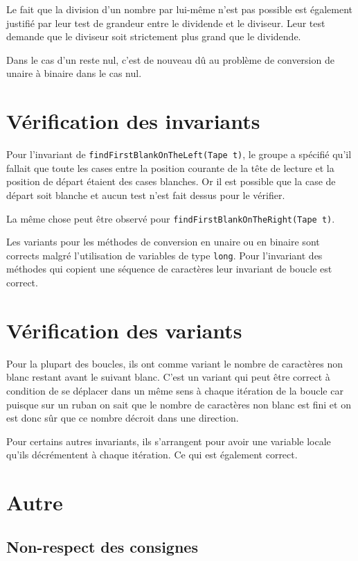 \documentclass[a4paper,11pt]{article}
\begin{document}
Le fait que la division d'un nombre par lui-même n'est pas possible est également justifié par leur test de grandeur entre le dividende et le diviseur. Leur test demande que le diviseur soit strictement plus grand que le dividende.

Dans le cas d'un reste nul, c'est de nouveau dû au problème de conversion de unaire à binaire dans le cas nul.

\section{Vérification des invariants}
Pour l'invariant de \texttt{findFirstBlankOnTheLeft(Tape t)}, le groupe a spécifié qu'il fallait que toute les cases entre la position courante de la tête de lecture et la position de départ étaient des cases blanches. Or il est possible que la case de départ soit blanche et aucun test n'est fait dessus pour le vérifier.

La même chose peut être observé pour \texttt{findFirstBlankOnTheRight(Tape t)}.

Les variants pour les méthodes de conversion en unaire ou en binaire sont corrects malgré l'utilisation de variables de type \texttt{long}. Pour l'invariant des méthodes qui copient une séquence de caractères leur invariant de boucle est correct.

\section{Vérification des variants}
Pour la plupart des boucles, ils ont comme variant le nombre de caractères non blanc restant avant le suivant blanc. C'est un variant qui peut être correct à condition de se déplacer dans un même sens à chaque itération de la boucle car puisque sur un ruban on sait que le nombre de caractères non blanc est fini et on est donc sûr que ce nombre décroit dans une direction.

Pour certains autres invariants, ils s'arrangent pour avoir une variable locale qu'ils décrémentent à chaque itération. Ce qui est également correct.

\section{Autre}

    \subsection{Non-respect des consignes}
\end{document}
